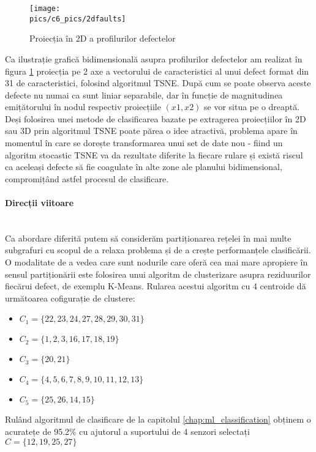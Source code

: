 \begin{figure}[H]
\centering
\texttt{[image: \\pics/c6\_pics/2dfaults]}
\caption{Proiecția în 2D a profilurilor defectelor}
\label{fig:tsne_faults}
\end{figure}

Ca ilustrație grafică bidimensională asupra profilurilor defectelor am realizat în figura \ref{fig:tsne_faults} proiecția pe 2 axe a vectorului de caracteristici al unui defect format din 31 de caracteristici, folosind algoritmul TSNE. După cum se poate observa aceste defecte nu numai ca sunt liniar separabile, dar în funcție de magnitudinea emițătorului în nodul respectiv proiecțiile $(x1, x2)$ se vor situa pe o dreaptă. Deși folosirea unei metode de clasificarea bazate pe extragerea proiecțiilor în 2D sau 3D prin algoritmul TSNE poate părea o idee atractivă, problema apare în momentul în care se dorește transformarea unui set de date nou - fiind un algoritm stocastic TSNE va da rezultate diferite la fiecare rulare și există riscul ca aceleași defecte să fie coagulate în alte zone ale planului bidimensional, compromițând astfel procesul de clasificare.


\paragraph{Direcții viitoare} \mbox{} \\

Ca abordare diferită putem să considerăm partiționarea rețelei în mai multe subgrafuri \cite{irofti2017dictionary}  cu scopul de a relaxa problema și de a crește performanțele clasificării. O modalitate de a vedea care sunt nodurile care oferă cea mai mare apropiere în sensul partiționării este folosirea unui algoritm de clusterizare asupra reziduurilor fiecărui defect, de exemplu K-Means. Rularea acestui algoritm cu 4 centroide dă următoarea cofigurație de clustere:

\begin{itemize}
    \item $C_1 = \{22, 23, 24, 27, 28, 29, 30, 31\}$
    \item $C_2 = \{1, 2, 3, 16, 17, 18, 19\}$
    \item $C_3 = \{  20, 21\}$
    \item $C_4 = \{ 4, 5, 6, 7, 8, 9, 10, 11, 12, 13\}$
    \item $C_5 = \{ 25, 26, 14, 15\}$
\end{itemize}

Rulând algoritmul de clasificare de la capitolul \ref{chap:ml_classification} obținem o acuratețe de 95.2\% cu ajutorul a suportului de 4 senzori selectați $C=\{12, 19, 25, 27\}$




